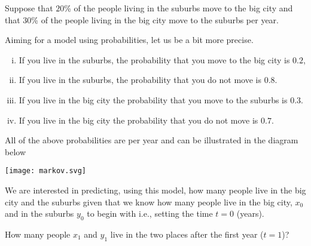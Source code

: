 \documentclass{article}
\begin{document}
\begin{example}\label{eksstokmatr}

  Suppose that $20$\% of the people living in the suburbs move to the big city and
  that $30$\% of the people living in the big city move to the suburbs per year.

  Aiming for a model using probabilities, let us be a bit more precise.

\begin{enumerate}[(i)]
\item
  If you live in the suburbs, the probability that you move to the big city is $0.2$,
\item
  If you live in the suburbs, the probability that you do not move is $0.8$.
\item
  If you live in the big city the probability that you move to the suburbs is $0.3$.
\item
  If you live in the big city the probability that you do not move is $0.7$.
\end{enumerate}
All of the above probabilities are per year and can be illustrated in the diagram below

\texttt{[image: markov.svg]}

We are interested in predicting, using this model, how many people live
in the big city and the suburbs given that we know how many people
live in the big city, $x_0$ and in the suburbs $y_0$ to begin with i.e.,
setting the time $t = 0$ (years).

How many people $x_1$ and $y_1$ live in the two places after the first year ($t=1$)?


\end{example}
\end{document}
